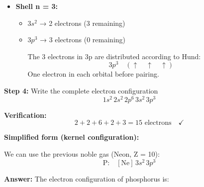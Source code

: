 \begin{exercise}
\begin{solu}
\begin{itemize}
            \item \textbf{Shell n = 3:}
            \begin{itemize}
                \item \(3s^2\) → 2 electrons (3 remaining)
                \item \(3p^3\) → 3 electrons (0 remaining)

                The 3 electrons in 3p are distributed according to Hund:
                \[
                    3p^3 \quad (\uparrow \quad \uparrow \quad \uparrow)
                \]
                One electron in each orbital before pairing.
            \end{itemize}
        \end{itemize}

        \textbf{Step 4:} Write the complete electron configuration
        \[
            \boxed{1s^2 \, 2s^2 \, 2p^6 \, 3s^2 \, 3p^3}
        \]

        \textbf{Verification:}
        \[
            2 + 2 + 6 + 2 + 3 = 15 \text{ electrons} \quad \checkmark
        \]

        \textbf{Simplified form (kernel configuration):}

        We can use the previous noble gas (Neon, Z = 10):
        \[
            \text{P:} \quad [\text{Ne}] \, 3s^2 \, 3p^3
        \]

        \textbf{Answer:} The electron configuration of phosphorus is: 
    \end{solu}
\end{exercise}
